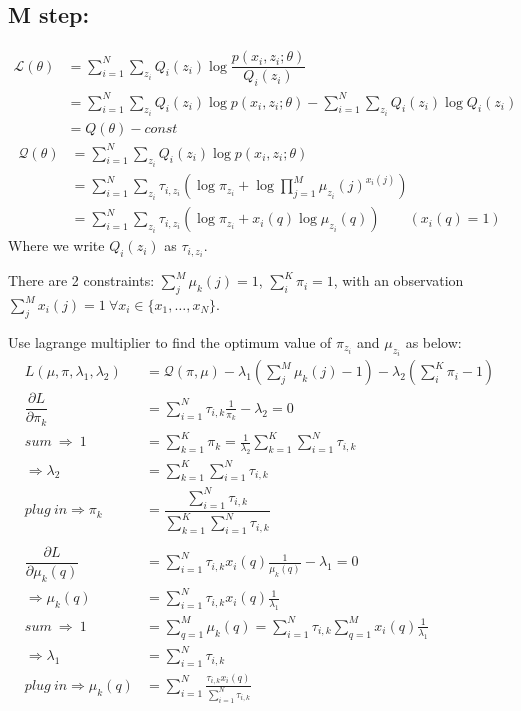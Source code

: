 \documentclass[a4paper,12pt]{article}
\begin{document}
\subsection{M step:}
\begin{align}
\mathcal{L}(\theta) & = \sum_{i = 1}^{N} \sum_{z_i} Q_i(z_i) \log \dfrac{p(x_i , z_i; \theta)}{Q_i(z_i)} \nonumber \\
& = \sum_{i = 1}^{N} \sum_{z_i} Q_i(z_i) \log p(x_i , z_i; \theta) - \sum_{i = 1}^{N} \sum_{z_i} Q_i(z_i) \log Q_i(z_i) \nonumber \\
& = Q(\theta) - const  \nonumber 
\end{align}
\begin{align}
\mathcal{Q}(\theta) & =  \sum_{i = 1}^{N} \sum_{z_i} Q_i(z_i) \log p(x_i , z_i; \theta)\nonumber \\
 & = \sum_{i = 1}^{N} \sum_{z_i}  \tau_{i,z_i} (\log \pi_{z_i} + \log  \prod_{j = 1}^{M}\mu_{z_i}(j)^{x_i(j)})\nonumber \\
 & = \sum_{i = 1}^{N} \sum_{z_i}  \tau_{i,z_i} (\log \pi_{z_i} + x_i(q)\log \mu_{z_i}(q)) \qquad (x_i(q) = 1)\nonumber 
\end{align}
Where we write $Q_i(z_i)$ as $\tau_{i,z_i}$.

There are 2 constraints: $\sum_{j}^{M}\mu_k(j) = 1$, $\sum_{i}^{K}\pi_i = 1$, with an observation $\sum_{j}^{M}x_i(j) = 1 \ \forall x_i \in \{ x_1, \ldots , x_N\}$. 

Use lagrange multiplier to find the optimum value of $\pi_{z_i}$ and $\mu_{z_i}$ as below:
\begin{align}
L(\mu, \pi, \lambda_1, \lambda_2) & = \mathcal{Q}(\pi, \mu) - \lambda_1 (\sum_{j}^{M}\mu_k(j) - 1) - \lambda_2 (\sum_{i}^{K}\pi_i  - 1) \nonumber \\
\dfrac{\partial L}{\partial \pi_k} &= \sum_{i = 1}^{N} \tau_{i,k} \frac{1}{\pi_k} - \lambda_2 = 0 \nonumber \\
sum\  \Rightarrow \ 1& = \sum_{k = 1}^{K} \pi_k = \frac{1}{\lambda_2} \sum_{k = 1}^{K}  \sum_{i = 1}^{N} \tau_{i,k}  \nonumber \\
\Rightarrow \lambda_2 &= \sum_{k = 1}^{K}  \sum_{i = 1}^{N} \tau_{i,k} \nonumber \\
plug\ in\Rightarrow \pi_k &= \dfrac{ \sum_{i = 1}^{N} \tau_{i,k}}{\sum_{k = 1}^{K}  \sum_{i = 1}^{N} \tau_{i,k}} \nonumber  \\
\qquad \nonumber \\
\dfrac{\partial L}{\partial \mu_k(q)} &=    \sum_{i = 1}^{N} \tau_{i,k} x_i(q) \frac{1}{\mu_k(q)} - \lambda_1 = 0 \nonumber \\
\Rightarrow \mu_k(q) &= \sum_{i = 1}^{N} \tau_{i,k} x_i(q) \frac{1}{\lambda_1} \nonumber \\
sum\ \Rightarrow \ 1&=\sum_{q=1}^{M}\mu_k(q) = \sum_{i = 1}^{N} \tau_{i,k} \sum_{q = 1}^{M}x_i(q) \frac{1}{\lambda_1} \nonumber \\
\Rightarrow \lambda_1 &= \sum_{i = 1}^{N}\tau_{i,k}   \nonumber \\
plug\ in \Rightarrow  \mu_k(q) &= \sum_{i = 1}^{N}\frac{ \tau_{i,k} x_i(q)}{\sum_{i = 1}^{N}\tau_{i,k}  } \nonumber
\end{align} 
\end{document}
